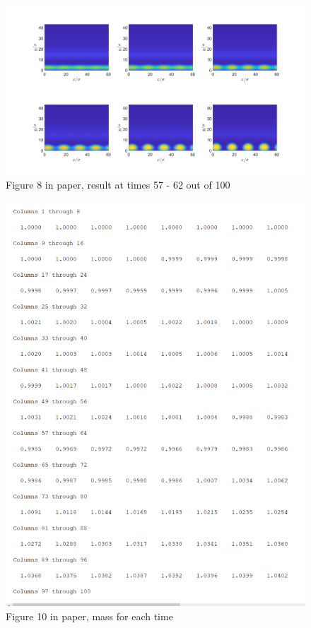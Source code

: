 \documentclass[11pt, a4paper]{article}
\theoremstyle{definition}
\begin{document}
	\begin{figure}[h]
		\centering
		\includegraphics[scale=0.25]{rhobar0072Zoom57to62.png}
		\caption{Figure 8 in paper, result at times 57 - 62 out of 100} 
		\label{F3}
	\end{figure}
		\begin{figure}[h]
		\centering
		\includegraphics[scale=0.6]{rhobar02.png}
		\caption{Figure 10 in paper, mass for each time} 
		\label{F4}
	\end{figure}
\end{document}
